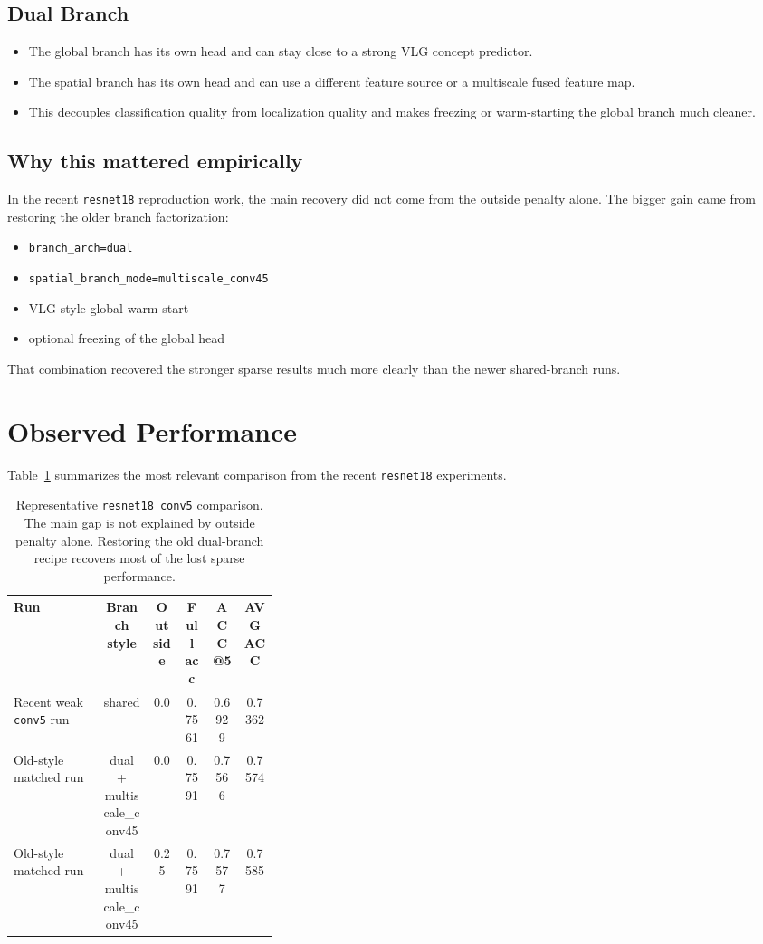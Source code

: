 \documentclass[11pt]{article}
\begin{document}
\subsection{Dual Branch}
\begin{itemize}
    \item The global branch has its own head and can stay close to a strong VLG
    concept predictor.
    \item The spatial branch has its own head and can use a different feature
    source or a multiscale fused feature map.
    \item This decouples classification quality from localization quality and
    makes freezing or warm-starting the global branch much cleaner.
\end{itemize}

\subsection{Why this mattered empirically}
In the recent \texttt{resnet18} reproduction work, the main recovery did not
come from the outside penalty alone. The bigger gain came from restoring the
older branch factorization:
\begin{itemize}
    \item \texttt{branch\_arch=dual}
    \item \texttt{spatial\_branch\_mode=multiscale\_conv45}
    \item VLG-style global warm-start
    \item optional freezing of the global head
\end{itemize}
That combination recovered the stronger sparse results much more clearly than
the newer shared-branch runs.

\section{Observed Performance}
Table~\ref{tab:branch-performance} summarizes the most relevant comparison from
the recent \texttt{resnet18} experiments.

\begin{table}[h]
\centering
\begin{tabular}{@{}p{0.34\linewidth}ccccc@{}}
\toprule
Run & Branch style & Outside & Full acc & ACC@5 & AVGACC \\
\midrule
Recent weak \texttt{conv5} run & shared & 0.0 & 0.7561 & 0.6929 & 0.7362 \\
Old-style matched run & dual + multiscale\_conv45 & 0.0 & 0.7591 & 0.7566 & 0.7574 \\
Old-style matched run & dual + multiscale\_conv45 & 0.25 & 0.7591 & 0.7577 & 0.7585 \\
\bottomrule
\end{tabular}
\caption{Representative \texttt{resnet18 conv5} comparison. The main gap is not
explained by outside penalty alone. Restoring the old dual-branch recipe
recovers most of the lost sparse performance.}
\label{tab:branch-performance}
\end{table}
\end{document}
